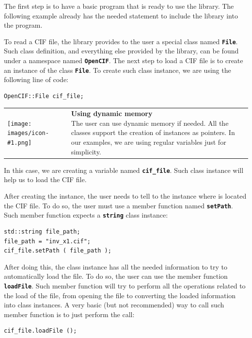\documentclass[11pt,twoside,openany,x11names,svgnames]{memoir}
\makeatletter
\newcommand{\IconNote}[3]
{
	\begin{table}[ht]
	\begin{tabular}{ lm{\dimexpr\textwidth-8\tabcolsep-\wd0}@{}}
		\toprule
		\texttt{[image: images/icon-\#1.png]}
		&
		\parbox[t]{155mm}{
		\textbf{#2} \\
		#3
		}
	\end{tabular}
\end{table}
}
\makeatother
\begin{document}
The first step is to have a basic program that is ready to use the library. The following example already has the needed statement to include the library into the program.



To read a CIF file, the library provides to the user a special class named \textbf{\texttt{File}}. Such class definition, and everything else provided by the library, can be found under a namespace named \textbf{\texttt{OpenCIF}}. The next step to load a CIF file is to create an instance of the class \textbf{\texttt{File}}. To create such class instance, we are using the following line of code:

\begin{lstlisting}[frame=single,style=CPPStyle]
OpenCIF::File cif_file;
\end{lstlisting}

\IconNote
	{info}
	{Using dynamic memory}
	{The user can use dynamic memory if needed. All the classes support the creation of instances as pointers. In our examples, we are using regular variables just for simplicity.}

In this case, we are creating a variable named \textbf{\texttt{cif\_file}}. Such class instance will help us to load the CIF file.

After creating the instance, the user needs to tell to the instance where is located the CIF file. To do so, the user must use a member function named \textbf{\texttt{setPath}}. Such member function expects a \textbf{\texttt{string}} class instance:

\begin{lstlisting}[frame=single,style=CPPStyle]
std::string file_path;
file_path = "inv_x1.cif";
cif_file.setPath ( file_path );
\end{lstlisting}

After doing this, the class instance has all the needed information to try to automatically load the file. To do so, the user can use the member function \textbf{\texttt{loadFile}}. Such member function will try to perform all the operations related to the load of the file, from opening the file to converting the loaded information into class instances. A very basic (but not recommended) way to call such member function is to just perform the call:

\begin{lstlisting}[frame=single,style=CPPStyle]
cif_file.loadFile ();
\end{lstlisting}
\end{document}
